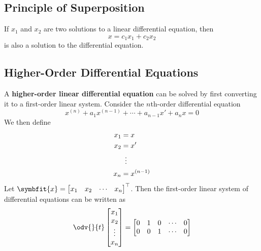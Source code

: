 \documentclass{article}
\begin{document}
\subsection{Principle of Superposition}
\begin{theorem}
    If \(x_1\) and \(x_2\) are two solutions to a linear differential
    equation, then
    \begin{equation*}
        x = c_1 x_1 + c_2 x_2
    \end{equation*}
    is also a solution to the differential equation.
\end{theorem}
\subsection{Higher-Order Differential Equations}
\begin{theorem}
    A \textbf{higher-order linear differential equation} can be solved
    by first converting it to a first-order linear system. Consider the
    \(n\)th-order differential equation
    \begin{equation*}
        x^{\left( n \right)} + a_1 x^{\left( n-1 \right)} + \cdots + a_{n-1} x' + a_n x = 0
    \end{equation*}
    We then define
    \begin{align*}
        x_1 & = x                      \\
        x_2 & = x'                     \\
            & \vdotswithin{=}          \\
        x_n & = x^{\left( n-1 \right)}
    \end{align*}
    Let \(\symbfit{x}=
    \begin{bmatrix}
        x_1 & x_2 & \cdots & x_n
    \end{bmatrix}^\top
    \). Then the first-order linear system of differential equations can
    be written as
    \begin{equation*}
        \odv{}{t}
        \begin{bmatrix}
            x_1               \\
            x_2               \\
            \vdotswithin{x_3} \\
            x_n
        \end{bmatrix}
        =
        \begin{bmatrix}
            0      & 1        & 0        & \cdots & 0      \\
            0      & 0        & 1        & \cdots & 0      \\

\end{bmatrix}
\end{equation*}
\end{theorem}
\end{document}
